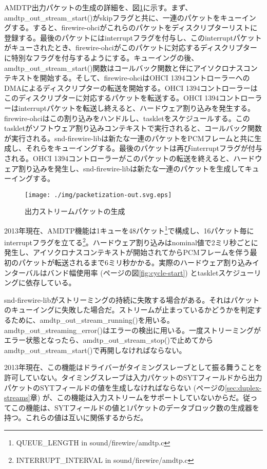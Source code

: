 \documentclass[onecolumn]{jarticle}
\begin{document}
AMDTP出力パケットの生成の詳細を、図\ref{fig:packetization-out}に示す。まず、amdtp\_out\_stream\_start()がskipフラグと共に、一連のパケットをキューイングする。すると、firewire-ohciがこれらのパケットをディスクリプターリストに登録する。最後のパケットにはinterruptフラグを付与し、このinterruptパケットがキューされたとき、firewire-ohciがこのパケットに対応するディスクリプターに特別なフラグを付与するようにする。キューイングの後、amdtp\_out\_stream\_start()関数はコールバック関数と伴にアイソクロナスコンテキストを開始する。そして、firewire-ohciはOHCI 1394コントローラーへのDMAによるディスクリプターの転送を開始する。OHCI 1394コントローラーはこのディスクリプターに対応するパケットを転送する。OHCI 1394コントローラーはinterruptパケットを転送し終えると、ハードウェア割り込みを発生する。firewire-ohciはこの割り込みをハンドルし、taskletをスケジュールする。このtaskletがソフトウェア割り込みコンテキストで実行されると、コールバック関数が実行される。snd-firewire-libは新たな一連のパケットをPCMフレームと共に生成し、それらをキューイングする。最後のパケットは再びinterruptフラグが付与される。OHCI 1394コントローラーがこのパケットの転送を終えると、ハードウェア割り込みを発生し、snd-firewire-libは新たな一連のパケットを生成してキューイングする。

\begin{figure}[H]
	\centering
	\texttt{[image: ./img/packetization-out.svg.eps]}
	\caption{{出力ストリームパケットの生成}}
	\label{fig:packetization-out}
\end{figure}

2013年現在、AMDTP機能は1キューを48パケット\footnote{QUEUE\_LENGTH in sound/firewire/amdtp.c}で構成し、16パケット毎にinterruptフラグを立てる\footnote{INTERRUPT\_INTERVAL in sound/firewire/amdtp.c}。ハードウェア割り込みはnominal値で2ミリ秒ごとに発生し、アイソクロナスコンテキストが開始されてからPCMフレームを伴う最初のパケットが転送されるまで6ミリ秒かかる。実際のハードウェア割り込みインターバルはバンド幅使用率 (\pageref{fig:cycle-start}ページの図\ref{fig:cycle-start}) とtaskletスケジューリングに依存している。

snd-firewire-libがストリーミングの持続に失敗する場合がある。それはパケットのキューイングに失敗した場合だ。ストリームが止まっているかどうかを判定するために、amdtp\_out\_stream\_running()を用いる。amdtp\_out\_streaming\_error()はエラーの検出に用いる。一度ストリーミングがエラー状態となったら、amdtp\_out\_stream\_stop()で止めてからamdtp\_out\_stream\_start()で再開しなければならない。


2013年現在、この機能はドライバーがタイミングスレーブとして振る舞うことを許可していない。タイミングスレーブは入力パケットのSYTフィールドから出力パケットのSYTフィールドの値を生成しなければならない (\pageref{sec:duplex-streams}ページの\ref{sec:duplex-streams}章) が、この機能は入力ストリームをサポートしていないからだ。従ってこの機能は、SYTフィールドの値と1パケットのデータブロック数の生成器を持つ。これらの値は互いに関係するからだ。
\end{document}
